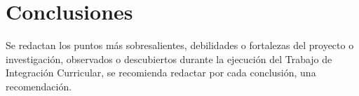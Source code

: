 \chapter*{Conclusiones}

Se redactan los puntos más sobresalientes, debilidades o fortalezas del proyecto o investigación, observados o descubiertos durante la ejecución del Trabajo de Integración Curricular, se recomienda redactar por cada conclusión, una recomendación.